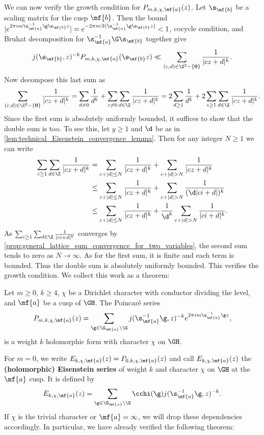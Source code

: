     We can now verify the growth condition for $P_{m,k,\chi,\mf{a}}(z)$. Let $\s_{\mf{b}}$ be a scaling matrix for the cusp $\mf{b}$. Then the bound $|e^{2\pi im\s_{\mf{a}}^{-1}\g\s_{\mf{b}}z}| = e^{-2\pi m\Im(\s_{\mf{a}}^{-1}\g\s_{\mf{b}}z)} < 1$, cocycle condition, and Bruhat decomposition for $\s_{\mf{a}}^{-1}\G\s_{\mf{b}}$ together give
    \[
      j(\s_{\mf{b}},z)^{-k}P_{m,k,\chi,\mf{a}}(\s_{\mf{b}}z) \ll \sum_{(c,d) \in \Z^{2}-\{\mathbf{0}\}}\frac{1}{|cz+d|^{k}}.
    \]
    Now decompose this last sum as
    \[
      \sum_{(c,d) \in \Z^{2}-\{\mathbf{0}\}}\frac{1}{|cz+d|^{k}} = \sum_{d \neq 0}\frac{1}{d^{k}}+\sum_{c \neq 0}\sum_{d \in \Z}\frac{1}{|cz+d|^{k}} = 2\sum_{d \ge 1}\frac{1}{d^{k}}+2\sum_{c \ge 1}\sum_{d \in \Z}\frac{1}{|cz+d|^{k}}.
    \]
    Since the first sum is absolutely uniformly bounded, it suffices to show that the double sum is too. To see this, let $y \ge 1$ and $\d$ be as in \cref{lem:technical_Eisenstein_convergence_lemma}. Then for any integer $N \ge 1$ we can write
    \begin{align*}
      \sum_{c \ge 1}\sum_{d \in \Z}\frac{1}{|cz+d|^{k}} &= \sum_{c+|d| \le N}\frac{1}{|cz+d|^{k}}+\sum_{c+|d| > N}\frac{1}{|cz+d|^{k}} \\
      &\le \sum_{c+|d| \le N}\frac{1}{|cz+d|^{k}}+\sum_{c+|d| > N}\frac{1}{(\d|ci+d|)^{k}} \\
      &\le \sum_{c+|d| \le N}\frac{1}{|cz+d|^{k}}+\frac{1}{\d^{k}}\sum_{c+|d| > N}\frac{1}{|ci+d|^{k}}.
    \end{align*}
    As $\sum_{c \ge 1}\sum_{d \in \Z}\frac{1}{|ci+d|^{k}}$ converges by \cref{prop:general_lattice_sum_convergence_for_two_variables}, the second sum tends to zero as $N \to \infty$. As for the first sum, it is finite and each term is bounded. Thus the double sum is absolutely uniformly bounded. This verifies the growth condition. We collect this work as a theorem:

    \begin{theorem}
      Let $m \ge 0$, $k \ge 4$, $\chi$ be a Dirichlet character with conductor dividing the level, and $\mf{a}$ be a cusp of $\GH$. The Poincar\'e series
      \[
        P_{m,k,\chi,\mf{a}}(z) = \sum_{\g \in \G_{\mf{a}}\backslash\G}j(\s_{\mf{a}}^{-1}\g,z)^{-k}e^{2\pi im\s_{\mf{a}}^{-1}\g z},
      \]
      is a weight $k$ holomorphic form with character $\chi$ on $\GH$.
    \end{theorem}
    
    For $m = 0$, we write $E_{k,\chi,\mf{a}}(z) = P_{0,k,\chi,\mf{a}}(z)$ and call $E_{k,\chi,\mf{a}}(z)$ the \textbf{(holomorphic) Eisenstein series} of weight $k$ and character $\chi$ on $\GH$ at the $\mf{a}$ cusp. It is defined by
    \[
      E_{k,\chi,\mf{a}}(z) = \sum_{\g \in \G_{\mf{a}}\backslash\G}\cchi(\g)j(\s_{\mf{a}}^{-1}\g,z)^{-k}.
    \]
    If $\chi$ is the trivial character or $\mf{a} = \infty$, we will drop these dependencies accordingly. In particular, we have already verified the following theorem:

